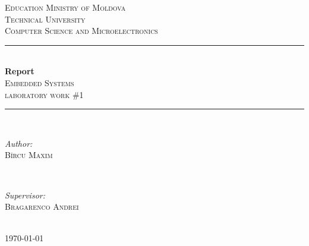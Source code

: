 \begin{titlepage}
\newcommand{\HRule}{\rule{\linewidth}{0.5mm}} 
\center
 

\textsc{\LARGE Education Ministry of Moldova}\\[1.5cm] 
\textsc{\Large Technical University}\\[0.5cm] 
\textsc{\large Computer Science and Microelectronics}\\[0.5cm]


\HRule \\[0.4cm]
{ \Huge \bfseries Report}\\[0.4cm]
\textsc{\large Embedded Systems}\\[0.5cm]
\textsc{ 
laboratory work \#1}\\[0.5cm]
\HRule \\[1.5cm]
 

\begin{minipage}{0.4\textwidth}
\begin{flushleft} \large
\emph{Author:}\\
\textsc{Bîrcu Maxim} %
\end{flushleft}
\end{minipage}
~
\begin{minipage}{0.4\textwidth}
\begin{flushright} \large
\emph{Supervisor:} \\
\textsc{Bragarenco Andrei} %
\end{flushright}
\end{minipage}\\[2cm]


\vfill
{\large \today}\\[2cm] %
\clearpage
 
\end{titlepage}